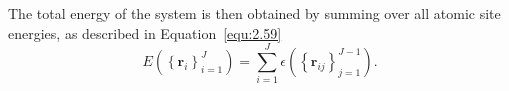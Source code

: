 

The total energy of the system is then obtained by summing over all atomic site energies, as described in Equation~\eqref{equ:2.59}
\[E(\left\{ \mathbf{r}_{i}\right\}_{i=1}^{J}) 
= \sum_{i=1}^{J} \epsilon(\left\{ \mathbf{r}_{ij}\right\}_{j=1}^{J-1}).\]

